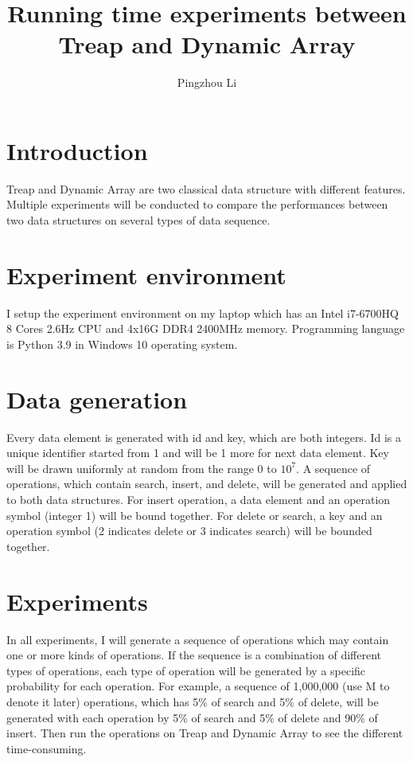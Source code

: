 \documentclass[11pt]{article}
\title{Running time experiments between Treap and Dynamic Array}
\author{Pingzhou Li}
\begin{document}
\maketitle


\section{Introduction}

Treap and Dynamic Array are two classical data structure with different features. Multiple experiments will be conducted to compare the performances between two data structures on several types of data sequence.

\section{Experiment environment}
I setup the experiment environment on my laptop which has an Intel i7-6700HQ 8 Cores 2.6Hz CPU and 4x16G DDR4 2400MHz memory.
Programming language is Python 3.9 in Windows 10 operating system.

\section{Data generation}
Every data element is generated with id and key, which are both integers.
Id is a unique identifier started from 1 and will be 1 more for next data element.
Key will be drawn uniformly at random from the range 0 to $10^7$.  
A sequence of operations, which contain search, insert, and delete, will be generated and applied to both data structures.
For insert operation, a data element and an operation symbol (integer 1) will be bound together.
For delete or search, a key and an operation symbol (2 indicates delete or 3 indicates search) will be bounded together.

\section{Experiments}
In all experiments, I will generate a sequence of operations which may contain one or more kinds of operations.
If the sequence is a combination of different types of operations, each type of operation will be generated by a specific probability for each operation.
For example, a sequence of 1,000,000 (use M to denote it later) operations, which has 5\% of search and 5\% of delete, will be generated with each operation by 5\% of search and 5\% of delete and 90\% of insert.
Then run the operations on Treap and Dynamic Array to see the different time-consuming.
\end{document}
